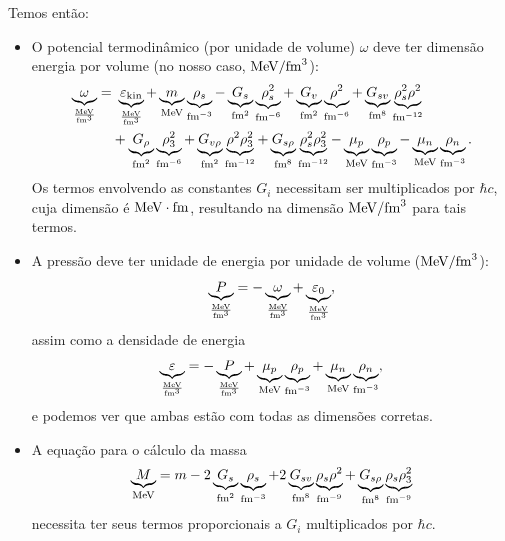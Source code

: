 Temos então:
\begin{fullwidth}
\begin{itemize}

\item O potencial termodinâmico (por unidade de volume) $\omega$ deve ter dimensão energia por volume (no nosso caso, $\rm{MeV}/\rm{fm}^3$):
\begin{equation}
\begin{split}
	\underbrace{\omega}_{\frac{\rm{MeV}}{\rm{fm}^3}} =&~ \underbrace{\varepsilon_{\rm{kin}}}_{\frac{\rm{MeV}}{\rm{fm}^3}} +\underbrace{m}_{\rm{MeV}}\underbrace{\rho_s}_{\rm{fm}^{-3}} - \underbrace{G_s}_{\rm{fm}^2}\underbrace{\rho_s^2}_{\rm{fm}^{-6}} + \underbrace{G_v}_{\rm{fm}^2}\underbrace{\rho^2}_{\rm{fm}^{-6}} + \underbrace{G_{sv}}_{\rm{fm}^8}\underbrace{\rho_s^2\rho^2}_{\rm{fm}^{-12}} \\
&+ \underbrace{G_\rho}_{\rm{fm}^2}\underbrace{\rho_3^2}_{\rm{fm}^{-6}} + \underbrace{G_{v\rho}}_{\rm{fm}^2}\underbrace{\rho^2\rho_3^2}_{\rm{fm}^{-12}} + \underbrace{G_{s\rho}}_{\rm{fm}^8}\underbrace{\rho_s^2\rho_3^2}_{\rm{fm}^{-12}} - \underbrace{\mu_p}_{\rm{MeV}}\underbrace{\rho_p}_{\rm{fm}^{-3}} - \underbrace{\mu_n}_{\rm{MeV}}\underbrace{\rho_n}_{\rm{fm}^{-3}}.
\end{split}
\end{equation}
%
Os termos envolvendo as constantes $G_i$ necessitam ser multiplicados por $\hbar c$, cuja dimensão é $\rm{MeV}\cdot\rm{fm}$, resultando na dimensão $\rm{MeV}/\rm{fm}^3$ para tais termos.

\item A pressão deve ter unidade de energia por unidade de volume ($\rm{MeV}/\rm{fm}^3$):
\begin{equation}
	\underbrace{P}_{\frac{\rm{MeV}}{\rm{fm}^3}} = - \underbrace{\omega}_{\frac{\rm{MeV}}{\rm{fm}^3}} + \underbrace{\varepsilon_0}_{\frac{\rm{MeV}}{\rm{fm}^3}},
\end{equation}
%
assim como a densidade de energia
\begin{equation}
	\underbrace{\varepsilon}_{\frac{\rm{MeV}}{\rm{fm}^3}} = - \underbrace{P}_{\frac{\rm{MeV}}{\rm{fm}^3}} + \underbrace{\mu_p}_{\rm{MeV}}\underbrace{\rho_p}_{\rm{fm}^{-3}} + \underbrace{\mu_n}_{\rm{MeV}}\underbrace{\rho_n}_{\rm{fm}^{-3}},
\end{equation}
%
e podemos ver que ambas estão com todas as dimensões corretas.

\item A equação para o cálculo da massa
\begin{equation}
	\underbrace{M}_{\rm{MeV}} = m - 2 \underbrace{G_s}_{\rm{fm}^2} \underbrace{\rho_s}_{\rm{fm}^{-3}} + 2 \underbrace{G_{sv}}_{\rm{fm}^8}\underbrace{\rho_s\rho^2}_{\rm{fm}^{-9}} + \underbrace{G_{s\rho}}_{\rm{fm}^8}\underbrace{\rho_s\rho_3^2}_{\rm{fm}^{-9}}
\end{equation}
%
necessita ter seus termos proporcionais a $G_i$ multiplicados por $\hbar c$.


\end{itemize}
\end{fullwidth}
